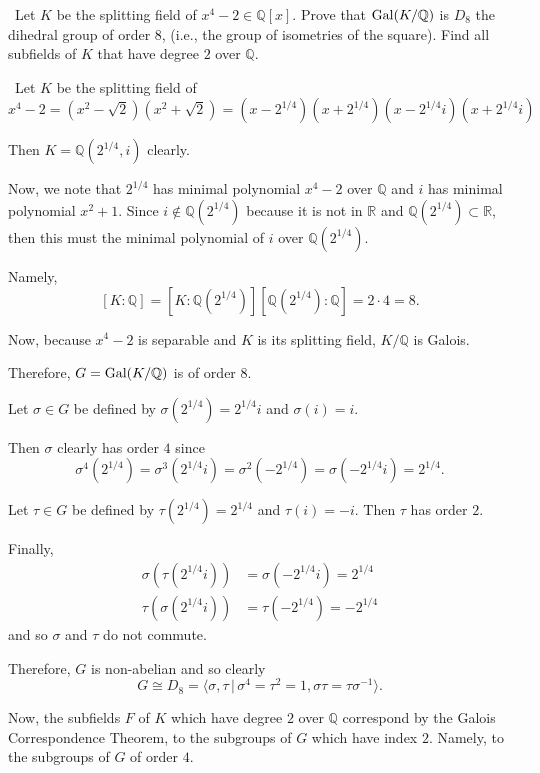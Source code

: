 \documentclass[12pt]{Qual}
\begin{document}
\begin{problem} $\,$
Let $K$ be the splitting field of $x^4-2\in\mathbb{Q}[x]$. Prove that $\text{Gal}(K/\mathbb{Q})$ is $D_8$ the dihedral group of order $8$, (i.e., the group of isometries of the square). Find all subfields of $K$ that have degree $2$ over $\mathbb{Q}$.
\end{problem}


\begin{solution}$\,$
Let $K$ be the splitting field of $$x^4-2=(x^2-\sqrt{2})(x^2+\sqrt{2})=(x-2^{1/4})(x+2^{1/4})(x-2^{1/4}i)(x+2^{1/4}i)$$

Then $K=\mathbb{Q}(2^{1/4},i)$ clearly.

Now, we note that $2^{1/4}$ has minimal polynomial $x^4-2$ over $\mathbb{Q}$ and $i$ has minimal polynomial $x^2+1$. Since $i\notin\mathbb{Q}(2^{1/4})$ because it is not in $\mathbb{R}$ and $\mathbb{Q}(2^{1/4})\subset\mathbb{R}$, then this must the minimal polynomial of $i$ over $\mathbb{Q}(2^{1/4})$.

Namely, $$[K:\mathbb{Q}]=[K:\mathbb{Q}(2^{1/4})][\mathbb{Q}(2^{1/4}):\mathbb{Q}]=2\cdot 4=8.$$

Now, because $x^4-2$ is separable and $K$ is its splitting field, $K/\mathbb{Q}$ is Galois.

Therefore, $G=\text{Gal}(K/\mathbb{Q})$ is of order $8$.

Let $\sigma\in G$ be defined by $\sigma(2^{1/4})=2^{1/4}i$ and $\sigma(i)=i$.

Then $\sigma$ clearly has order $4$ since $$\sigma^4(2^{1/4})=\sigma^3(2^{1/4}i)=\sigma^2(-2^{1/4})=\sigma(-2^{1/4}i)=2^{1/4}.$$

Let $\tau\in G$ be defined by $\tau(2^{1/4})=2^{1/4}$ and $\tau(i)=-i$. Then $\tau$ has order $2$.

Finally, \begin{align*}
    \sigma(\tau(2^{1/4}i))&=\sigma(-2^{1/4}i)=2^{1/4}\\
    \tau(\sigma(2^{1/4}i))&=\tau(-2^{1/4})=-2^{1/4}
\end{align*} and so $\sigma$ and $\tau$ do not commute.

Therefore, $G$ is non-abelian and so clearly $$G\cong D_8=\langle\sigma,\tau\,|\,\sigma^4=\tau^2=1,\sigma\tau=\tau\sigma^{-1}\rangle.$$

Now, the subfields $F$ of $K$ which have degree $2$ over $\mathbb{Q}$ correspond by the Galois Correspondence Theorem, to the subgroups of $G$ which have index $2$. Namely, to the subgroups of $G$ of order $4$.


\end{solution}
\end{document}
